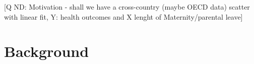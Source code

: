 \documentclass[11pt, a4paper,draft]{article} %
\begin{document}
[Q ND: Motivation - shall we have a cross-country (maybe OECD data) scatter with linear fit, Y: health outcomes and X lenght of Maternity/parental leave]





\newpage
\section{Background}\label{sec:background}
\end{document}
